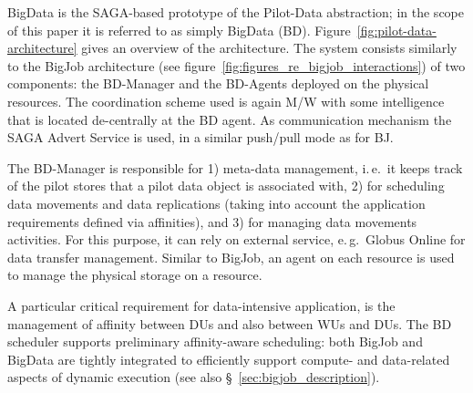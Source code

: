 BigData is the SAGA-based prototype of the Pilot-Data
abstraction; in the scope of this paper it is referred to as simply
BigData (BD).  Figure~\ref{fig:pilot-data-architecture} gives an
overview of the architecture.  The system consists similarly to the BigJob 
architecture (see figure~\ref{fig:figures_re_bigjob_interactions}) of two 
components: the BD-Manager and the BD-Agents deployed on the physical
resources. The coordination scheme used is again M/W with some
intelligence that is located de-centrally at the BD agent. As
communication mechanism the SAGA Advert Service is used, in a similar
push/pull mode as for BJ.

The BD-Manager is responsible for 1) meta-data management, i.\,e.\ it
keeps track of the pilot stores that a pilot data object is associated
with, 2) for scheduling data movements and data replications (taking
into account the application requirements defined via affinities), and
3) for managing data movements activities. For this purpose, it can rely
on external service, e.\,g.\ Globus Online for data transfer management.  
Similar to BigJob, an agent on each resource is used to manage the physical 
storage on a resource.  

A particular critical requirement for data-intensive application, is
the management of affinity between DUs and also between WUs and
DUs. The BD scheduler supports preliminary affinity-aware
scheduling: both BigJob and BigData are tightly integrated to
efficiently support compute- and data-related aspects of dynamic
execution (see also \S~\ref{sec:bigjob_description}).
 




